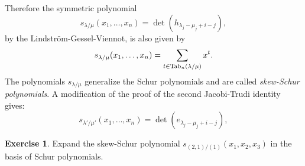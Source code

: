 \documentclass[11pt]{amsproc}
\theoremstyle{definition}
\theoremstyle{example}
\newtheorem{exercise}[theorem]{Exercise}
\newcommand{\Tab}{\textup{Tab}}
\begin{document}
Therefore the symmetric polynomial
\begin{equation}
  \label{eq:skew-jth}
  s_{\lambda/\mu}(x_1,\dotsc,x_n) = \det(h_{\lambda_j-\mu_j+i-j}),
\end{equation}
by the Lindstr\"om-Gessel-Viennot, is also given by
\begin{equation}
  \label{eq:skew-kostka}
  s_{\lambda/\mu}(x_1,\dotsc,x_n) = \sum_{t\in \Tab_n(\lambda/\mu)} x^t.
\end{equation}
The polynomials $s_{\lambda/\mu}$ generalize the Schur polynomials and are called \emph{skew-Schur polynomials}.
A modification of the proof of the second Jacobi-Trudi identity gives:
\begin{equation}
  \label{eq:skew-jti}
  s_{\lambda'/\mu'}(x_1,\dotsc,x_n) = \det(e_{\lambda_j-\mu_j+i-j}),
\end{equation}
\begin{exercise}
  Expand the skew-Schur polynomial $s_{(2,1)/(1)}(x_1,x_2,x_3)$ in the basis of Schur polynomials.
\end{exercise}
\end{document}
